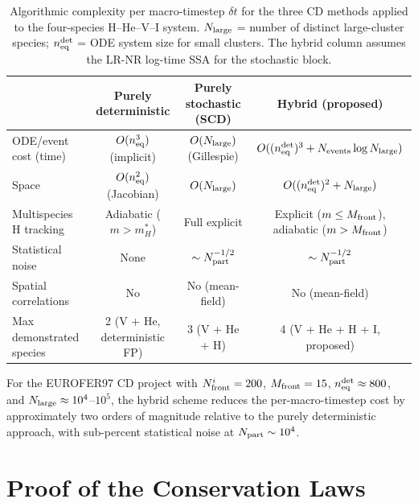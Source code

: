 \begin{table}[htbp]
\centering
\caption{Algorithmic complexity per macro-timestep $\delta t$ for the
three CD methods applied to the four-species H--He--V--I system.
$N_{\rm large}$ = number of distinct large-cluster species;
$n_{\rm eq}^{\rm det}$ = ODE system size for small clusters.
The hybrid column assumes the LR-NR log-time SSA for the stochastic
block.}
\label{tab:hybrid_complexity}
\renewcommand{\arraystretch}{1.3}
\begin{tabular}{@{}lccc@{}}
\toprule
& \textbf{Purely deterministic} & \textbf{Purely stochastic (SCD)}
  & \textbf{Hybrid (proposed)} \\
\midrule
ODE/event cost (time) &
  $O(n_{\rm eq}^3)$ (implicit) &
  $O(N_{\rm large})$ (Gillespie) &
  $O((n_{\rm eq}^{\rm det})^3 + N_{\rm events}\log N_{\rm large})$ \\
Space &
  $O(n_{\rm eq}^2)$ (Jacobian) &
  $O(N_{\rm large})$ &
  $O((n_{\rm eq}^{\rm det})^2 + N_{\rm large})$ \\
Multispecies H tracking &
  Adiabatic ($m > m_H^*$) &
  Full explicit &
  Explicit ($m \leq M_{\rm front}$),
  adiabatic ($m > M_{\rm front}$) \\
Statistical noise &
  None &
  $\sim N_{\rm part}^{-1/2}$ &
  $\sim N_{\rm part}^{-1/2}$ \\
Spatial correlations &
  No &
  No (mean-field) &
  No (mean-field) \\
Max demonstrated species &
  2 (V + He, deterministic FP) &
  3 (V + He + H) &
  4 (V + He + H + I, proposed) \\
\bottomrule
\end{tabular}
\end{table}

For the EUROFER97 CD project with $N_{\rm front}^i = 200$,
$M_{\rm front} = 15$, $n_{\rm eq}^{\rm det} \approx 800$,
and $N_{\rm large} \approx 10^4$--$10^5$, the hybrid scheme
reduces the per-macro-timestep cost by approximately two orders
of magnitude relative to the purely deterministic approach, with
sub-percent statistical noise at $N_{\rm part} \sim 10^4$.

\appendix
\section{Proof of the Conservation Laws}
\label{app:conservation}


